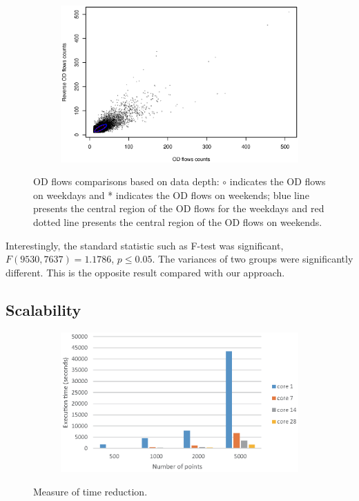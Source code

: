 \documentclass[a4paper,UKenglish]{lipics-v2016}
\begin{document}
\begin{figure}
	\centering
	\begin{subfigure}[b]{0.7\textwidth}
		\includegraphics[width=\textwidth]{images/com_weekdays_weekends.eps}
	\end{subfigure}
	\caption{OD flows comparisons based on data depth: $\circ$ indicates the OD flows on weekdays and * indicates the OD flows on weekends; blue line presents the central region of the OD flows for the weekdays and red dotted line presents the central region of the OD flows on weekends. }\label{fig:OD_comparisons}	
\end{figure}

Interestingly, the standard statistic such as  F-test was significant, $F(9530,7637) =1.1786$, $p \leq 0.05$. The variances of two groups were significantly different. This is the opposite result compared with our approach. 


\subsection{Scalability}

\begin{figure}
	\centering
	\begin{subfigure}[b]{0.7\textwidth}
		\includegraphics[width=\textwidth]{images/scalability.eps}
	\end{subfigure}
	\caption{Measure of time reduction. }\label{fig:scalability}	
\end{figure}
\end{document}
